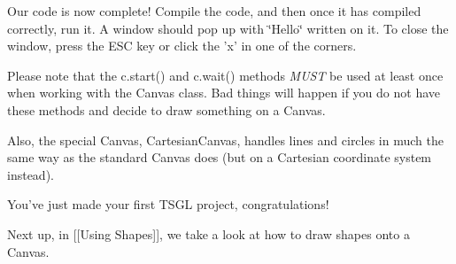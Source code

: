 Our code is now complete! Compile the code, and then once it has compiled correctly, run it. A window should pop up with \char`\"{}\-Hello\char`\"{} written on it. To close the window, press the E\-S\-C key or click the 'x' in one of the corners.

Please note that the {\ttfamily c.\-start()} and {\ttfamily c.\-wait()} methods {\itshape M\-U\-S\-T} be used at least once when working with the Canvas class. Bad things will happen if you do not have these methods and decide to draw something on a Canvas.

Also, the special Canvas, Cartesian\-Canvas, handles lines and circles in much the same way as the standard Canvas does (but on a Cartesian coordinate system instead).

You've just made your first T\-S\-G\-L project, congratulations!

Next up, in \mbox{[}\mbox{[}Using Shapes\mbox{]}\mbox{]}, we take a look at how to draw shapes onto a Canvas. 